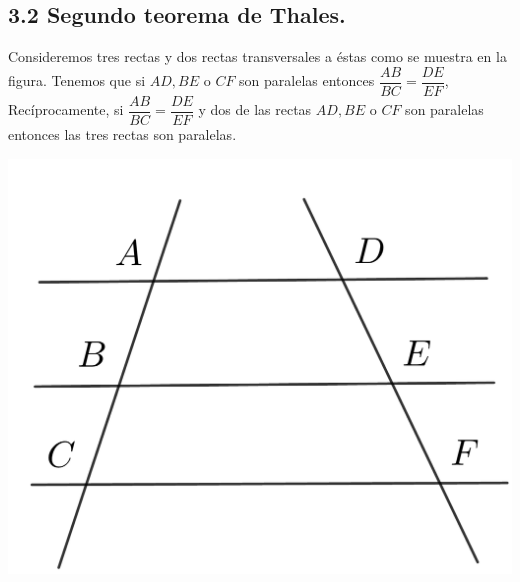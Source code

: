 \documentclass[12pt,a4paper]{article}
\begin{document}
\subsection*{3.2 Segundo teorema de Thales.}
Consideremos tres rectas y dos rectas transversales a éstas como se muestra en la figura. Tenemos que si $AD, BE$ o $CF$ son paralelas entonces $\dfrac{AB}{BC}=\dfrac{DE}{EF}$, Recíprocamente, si $\dfrac{AB}{BC}=\dfrac{DE}{EF}$ y dos de las rectas $AD, BE$ o $CF$ son paralelas entonces las tres rectas son paralelas.
\begin{center}
\includegraphics[scale=0.6]{thales.png} 
\end{center}
\end{document}

